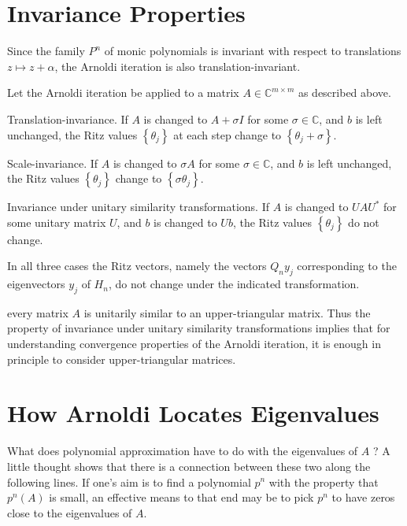 \section{Invariance Properties}
Since the family $ P^{n} $ of monic polynomials is invariant with respect to translations $ z\mapsto z+\alpha $, the Arnoldi iteration is also translation-invariant. 


\begin{theorem}
Let the Arnoldi iteration be applied to a matrix $A \in \mathbb{C}^{m \times m}$ as described above.

Translation-invariance. If $A$ is changed to $A+\sigma I$ for some $\sigma \in \mathbb{C}$, and $b$ is left unchanged, the Ritz values $\left\{\theta_j\right\}$ at each step change to $\left\{\theta_j+\sigma\right\}$.

Scale-invariance. If $A$ is changed to $\sigma A$ for some $\sigma \in \mathbb{C}$, and $b$ is left unchanged, the Ritz values $\left\{\theta_j\right\}$ change to $\left\{\sigma \theta_j\right\}$.

Invariance under unitary similarity transformations. If $A$ is changed to $U A U^*$ for some unitary matrix $U$, and $b$ is changed to $U b$, the Ritz values $\left\{\theta_j\right\}$ do not change.

In all three cases the $\mathrm{Ritz}$ vectors, namely the vectors $Q_n y_j$ corresponding to the eigenvectors $y_j$ of $H_n$, do not change under the indicated transformation.
\end{theorem}

every matrix $A$ is unitarily similar to an upper-triangular matrix. Thus the property of invariance under unitary similarity transformations implies that for understanding convergence properties of the Arnoldi iteration, it is enough in principle to consider upper-triangular matrices. 


\section{How Arnoldi Locates Eigenvalues} 
What does polynomial approximation have to do with the eigenvalues of $A$ ? A little thought shows that there is a connection between these two along the following lines. If one's aim is to find a polynomial $p^n$ with the property that $p^n(A)$ is small, an effective means to that end may be to pick $p^n$ to have zeros close to the eigenvalues of $A$.


